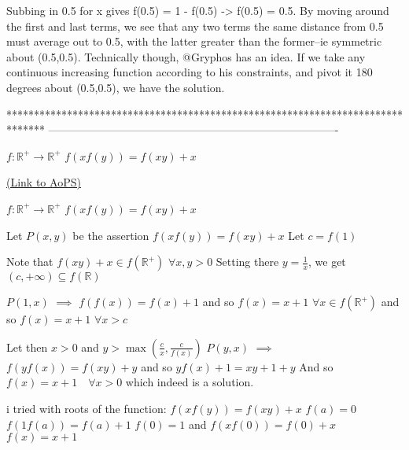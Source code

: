 \begin{solution}
	Subbing in 0.5 for x gives f(0.5) = 1 - f(0.5) -> f(0.5) = 0.5. By moving around the first and last terms, we see that any two terms the same distance from 0.5 must average out to 0.5, with the latter greater than the former--ie symmetric about (0.5,0.5). Technically though, @Gryphos has an idea. If we take any continuous increasing function according to his constraints, and pivot it 180 degrees about (0.5,0.5), we have the solution.
\end{solution}
*******************************************************************************
-------------------------------------------------------------------------------

\begin{problem}
	$f: \mathbb{R^+} \to \mathbb{R^+}$
$f(xf(y))=f(xy)+x$

	\flushright \href{https://artofproblemsolving.com/community/c6h1602151}{(Link to AoPS)}
\end{problem}



\begin{solution}
	\begin{tcolorbox}$f: \mathbb{R^+} \to \mathbb{R^+}$
$f(xf(y))=f(xy)+x$\end{tcolorbox}
Let $P(x,y)$ be the assertion $f(xf(y))=f(xy)+x$
Let $c=f(1)$

Note that $f(xy)+x\in f(\mathbb R^+)$ $\forall x,y>0$
Setting there $y=\frac 1x$, we get $(c,+\infty)\subseteq f(\mathbb R)$

$P(1,x)$ $\implies$ $f(f(x))=f(x)+1$ and so $f(x)=x+1$ $\forall x\in f(\mathbb R^+)$ and so 
$f(x)=x+1$ $\forall x>c$

Let then $x>0$ and $y>\max(\frac cx,\frac c{f(x)})$
$P(y,x)$ $\implies$ $f(yf(x))=f(xy)+y$ and so 
$yf(x)+1=xy+1+y$
And so $\boxed{f(x)=x+1\quad\forall x>0}$ which indeed is a solution.


\end{solution}



\begin{solution}
	i tried with roots of the function:
$f(xf(y))=f(xy)+x$
$f(a)=0$
$f(1f(a))=f(a)+1$
$f(0)=1$
and $f(xf(0))=f(0)+x$
$f(x)=x+1$
\end{solution}



